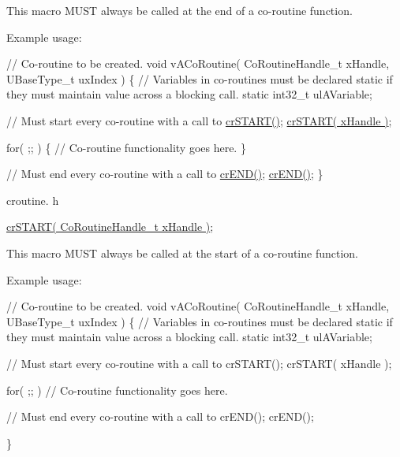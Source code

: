 This macro M\+U\+ST always be called at the end of a co-\/routine function.

Example usage\+: 
\begin{DoxyPre}
// Co-routine to be created.
void vACoRoutine( CoRoutineHandle\_t xHandle, UBaseType\_t uxIndex )
\{
// Variables in co-routines must be declared static if they must maintain value across a blocking call.
static int32\_t ulAVariable;\end{DoxyPre}



\begin{DoxyPre}  // Must start every co-routine with a call to \hyperlink{vendor_2ceedling_2plugins_2freertos_2src_2freertos_2include_2croutine_8h_a19a57a201a325e8af1207ed68c4aedde}{crSTART()};
  \hyperlink{vendor_2ceedling_2plugins_2freertos_2src_2freertos_2include_2croutine_8h_a19a57a201a325e8af1207ed68c4aedde}{crSTART( xHandle )};\end{DoxyPre}



\begin{DoxyPre}  for( ;; )
  \{
       // Co-routine functionality goes here.
  \}\end{DoxyPre}



\begin{DoxyPre}  // Must end every co-routine with a call to \hyperlink{vendor_2ceedling_2plugins_2freertos_2src_2freertos_2include_2croutine_8h_ae6038cc976689b50000475ebfc4e2f23}{crEND()};
  \hyperlink{vendor_2ceedling_2plugins_2freertos_2src_2freertos_2include_2croutine_8h_ae6038cc976689b50000475ebfc4e2f23}{crEND()};
\}
\end{DoxyPre}


croutine. h 
\begin{DoxyPre}
\hyperlink{vendor_2ceedling_2plugins_2freertos_2src_2freertos_2include_2croutine_8h_a19a57a201a325e8af1207ed68c4aedde}{crSTART( CoRoutineHandle\_t xHandle )};\end{DoxyPre}


This macro M\+U\+ST always be called at the start of a co-\/routine function.

Example usage\+: 
\begin{DoxyPre}
// Co-routine to be created.
void vACoRoutine( CoRoutineHandle\_t xHandle, UBaseType\_t uxIndex )
\{
// Variables in co-routines must be declared static if they must maintain value across a blocking call.
static int32\_t ulAVariable;
\begin{DoxyVerb}// Must start every co-routine with a call to crSTART();
crSTART( xHandle );

for( ;; )
{
     // Co-routine functionality goes here.
}

// Must end every co-routine with a call to crEND();
crEND();
\end{DoxyVerb}

\}\end{DoxyPre}


